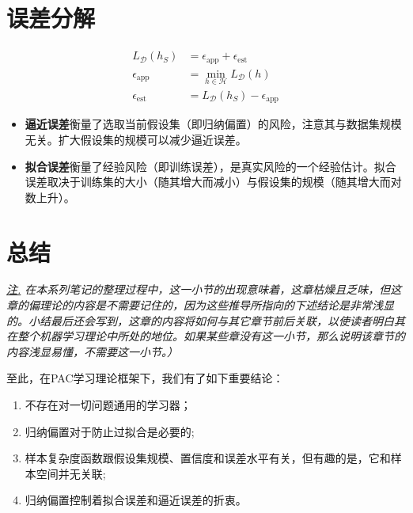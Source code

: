 \documentclass{article}
\begin{document}
\section{误差分解}

	\begin{equation}
	\begin{split}
	L_\mathcal{D}(h_S) &= \epsilon_{\mathrm{app}}+\epsilon_{\mathrm{est}} \\
	\epsilon_{\mathrm{app}} &= \min\limits_{h\in\mathcal{H}}L_\mathcal{D}(h) \\
	\epsilon_{\mathrm{est}} &= L_\mathcal{D}(h_S)-\epsilon_{\mathrm{app}}
	\end{split}
	\end{equation}		

	\begin{itemize}
	\item \textbf{逼近误差}衡量了选取当前假设集（即归纳偏置）的风险，注意其与数据集规模无关。扩大假设集的规模可以减少逼近误差。
	\item \textbf{拟合误差}衡量了经验风险（即训练误差），是真实风险的一个经验估计。拟合误差取决于训练集的大小（随其增大而减小）与假设集的规模（随其增大而对数上升）。
	\end{itemize}

\section{总结}

	\vspace{2mm}
	\begin{scriptsize}
	\begin{spacing}{1.2}
	{\sffamily
	\noindent\textit{\underline{注.} 在本系列笔记的整理过程中，这一小节的出现意味着，这章枯燥且乏味，但这章的偏理论的内容是不需要记住的，因为这些推导所指向的下述结论是非常浅显的。小结最后还会写到，这章的内容将如何与其它章节前后关联，以使读者明白其在整个机器学习理论中所处的地位。如果某些章没有这一小节，那么说明该章节的内容浅显易懂，不需要这一小节。）
	}}
	\end{spacing}
	\end{scriptsize}
	\vspace{2mm}

	至此，在PAC学习理论框架下，我们有了如下重要结论：
\begin{enumerate}
\item  不存在对一切问题通用的学习器；
\item  归纳偏置对于防止过拟合是必要的;
\item  样本复杂度函数跟假设集规模、置信度和误差水平有关，但有趣的是，它和样本空间并无关联;
\item  归纳偏置控制着拟合误差和逼近误差的折衷。
\end{enumerate}
\end{document}

